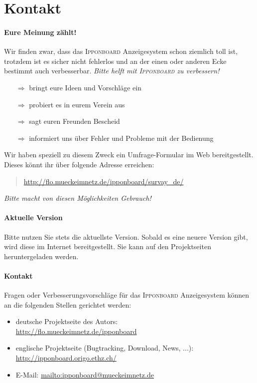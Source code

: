 ﻿\documentclass[11pt,numbers=noenddot]{scrreprt}
\newcommand*{\IB}{\begingroup{\fontspec{Cuprum}\selectfont\textsc{Ipponboard}} \endgroup}
\begin{document}
\newpage
\section{Kontakt}
\paragraph{Eure Meinung zählt!}
Wir finden zwar, dass das \IB Anzeigesystem schon ziemlich toll ist, trotzdem ist es sicher nicht fehlerlos und an der einen oder anderen Ecke bestimmt auch verbesserbar. \textit{Bitte helft mit \IB zu verbessern!}

\begin{itemize}
	\item[$\Rightarrow$] bringt eure Ideen und Vorschläge ein
	\item[$\Rightarrow$] probiert es in eurem Verein aus
	\item[$\Rightarrow$] sagt euren Freunden Bescheid
	\item[$\Rightarrow$] informiert uns über Fehler und Probleme mit der Bedienung
\end{itemize}
Wir haben speziell zu diesem Zweck ein Umfrage-Formular im Web bereitgestellt. Dieses könnt ihr über folgende Adresse erreichen:
\begin{quote}
	\url{http://flo.mueckeimnetz.de/ipponboard/survay_de/}
\end{quote}
{\parindent 0pt\textit{Bitte macht von diesen Möglichkeiten Gebrauch!}}

\paragraph{Aktuelle Version}
Bitte nutzen Sie stets die aktuellste Version. Sobald es eine neuere Version gibt, wird diese im Internet bereitgestellt. Sie kann auf den Projektseiten heruntergeladen werden.

\paragraph{Kontakt}
Fragen oder Verbesserungsvorschläge für das \IB Anzeigesystem können an die folgenden Stellen gerichtet werden:
\begin{itemize}
	\item deutsche Projektseite des Autors:\\\url{http://flo.mueckeimnetz.de/ipponboard}
	\item englische Projektseite (Bugtracking, Download, News, ...):\\\url{http://ipponboard.origo.ethz.ch/}
	\item E-Mail: \url{mailto:ipponboard@mueckeimnetz.de}
\end{itemize}
\end{document}
